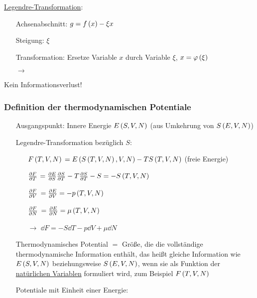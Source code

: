 \uline{Legendre-Transformation}:
\begin{figure}[H]
  \centering
  
\end{figure}

\begin{itemize}[align=left]
  \item[Achsenabschnitt:] $g = f\left( x \right) - \xi x$
  \item[Steigung:] $\xi$
  \item[Transformation:] Ersetze Variable $x$ durch Variable $\xi$, $x = \varphi\left( \xi \right)$
  \item[$\rightarrow$] 
\end{itemize}

Kein Informationsverlust!

\subsubsection{Definition der thermodynamischen Potentiale}
\begin{itemize}[align=left]
  \item[Ausgangspunkt:] Innere Energie $E\left( S,V,N \right)$ (aus Umkehrung von $S\left( E,V,N \right)$)
  \item[Legendre-Transformation bezüglich $S$:]\begin{itemize}[align=left]
    \item[$F\left( T,V,N \right)$] $= E\left( S\left( T,V,N \right),V,N \right) - T S\left( T,V,N \right)$ (freie Energie)
    \item[$\frac{\partial F}{\partial T}$] $=\frac{\partial E}{\partial S}\frac{\partial S}{\partial T} - T \frac{\partial S}{\partial T} - S = - S\left( T,V,N \right)$
    \item[$\frac{\partial F}{\partial V}$] $= \frac{\partial E}{\partial V} = -p\left( T,V,N \right)$
    \item[$\frac{\partial F}{\partial N}$] $= \frac{\partial E}{\partial N} = \mu\left( T,V,N \right)$
    \item[$\rightarrow$] $\dd{F} = - S\dd{T} - p \dd{V} + \mu\dd{N}$
  \end{itemize}
  \item[Thermodynamisches Potential] $=$ Größe, die die vollständige thermodynamische Information enthält, das heißt gleiche Information wie $E\left( S,V,N \right)$ beziehungsweise $S\left( E,V,N \right)$, wenn sie als Funktion der \uline{natürlichen Variablen} formuliert wird, zum Beispiel $F\left( T,V,N \right)$
  \item[Potentiale mit Einheit einer Energie:]
\end{itemize}

